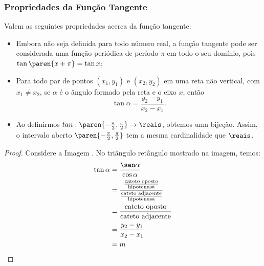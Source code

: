 \subsubsection{Propriedades da Função Tangente}

\begin{proposition}
    Valem as seguintes propriedades acerca da função tangente:

\begin{itemize}
  \item Embora não seja definida para todo número real, a função
  tangente pode ser considerada uma função periódica de período
  $\pi$ em todo o seu domínio, pois $\tan \paren{x+\pi} = \tan x$;
  \item Para todo par de pontos  $(x_1, y_1)$ e $(x_2, y_2)$ em uma reta não vertical, com $x_1 \neq x_2$, se
  $\alpha$ é o ângulo formado pela reta e o eixo $x$, então $$\tan
  \alpha = \frac {y_2 - y_1} {x_2 - x_1}.$$
  \item Ao definirmos $tan: \paren{- \frac {\pi} 2, \frac {\pi} 2} \to \reais$,
obtemos uma bijeção. Assim, o intervalo aberto $\paren{- \frac {\pi}
2, \frac {\pi} 2}$ tem a mesma cardinalidade que $\reais$.
\end{itemize}
\end{proposition}

\begin{proof}
  \item %
  \item Considere a Imagem . %
  No triângulo retângulo mostrado na imagem, temos:
  \begin{align*}
    \tan \alpha &= \frac {\sen\alpha}{\cos\alpha} \\ 
    &= \frac{ \frac{\text{cateto oposto}}{\text{hipotenusa}}   }{\frac{\text{cateto adjacente}}{\text{hipotenusa}}} \\
    &= \frac{\text{cateto oposto}}{\text{cateto adjacente}}\\
    &= \frac{y_2 - y_1}{x_2 - x_1} \\ &= m
  \end{align*}
  \item %
\end{proof}